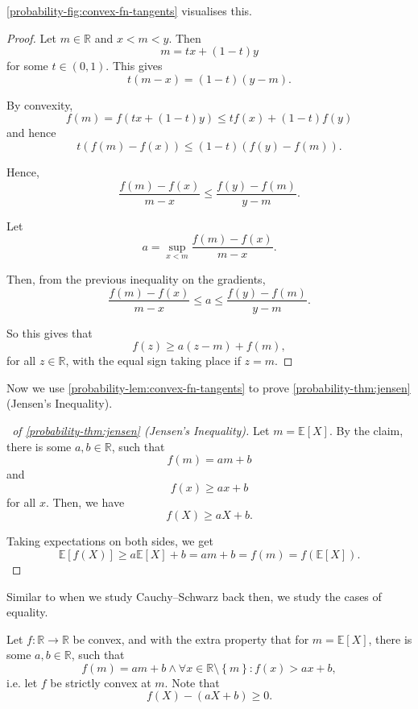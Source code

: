 \documentclass[11pt]{article}
\numberwithin{equation}{section}
\theoremstyle{definition}
\theoremstyle{remark}
\newcommand{\pqty}[1]{\left(#1\right)}
\newcommand{\bqty}[1]{\left[#1\right]}
\newcommand{\Bqty}[1]{\left\{#1\right\}}
\newcommand{\oointv}[2]{(#1,#2)}
\newcommand{\functiondomain}[3]{#1:#2\to #3}
\newcommand{\RR}{\mathbb R}
\newcommand{\Expt}{\mathbb E}
\begin{document}
\autoref{probability-fig:convex-fn-tangents} visualises this.

\begin{proof}\label{probability-proof-030}
    Let \(m \in \RR\) and \(x < m < y\). Then
    \[
        m = tx + \pqty{1 - t}y
    \]
    for some \(t \in \oointv{0}{1}\). This gives
    \[
        t\pqty{m - x} = \pqty{1 - t} \pqty{y - m}.
    \]

    By convexity,
    \[
        f\pqty{m} = f\pqty{tx + \pqty{1 - t} y} \leq t f\pqty{x} + \pqty{1 - t} f\pqty{y}
    \]
    and hence
    \[
        t\pqty{f\pqty{m} - f\pqty{x}} \leq \pqty{1 - t} \pqty{f\pqty{y} - f\pqty{m}}.
    \]

    Hence,
    \[
        \frac{f\pqty{m} - f\pqty{x}}{m - x} \leq \frac{f\pqty{y} - f\pqty{m}}{y - m}.
    \]

    Let
    \[
        a = \sup_{x < m} \frac{f\pqty{m} - f\pqty{x}}{m - x}.
    \]

    Then, from the previous inequality on the gradients,
    \[
        \frac{f\pqty{m} - f\pqty{x}}{m - x} \leq a \leq \frac{f\pqty{y} - f\pqty{m}}{y - m}.
    \]

    So this gives that
    \[
        f\pqty{z} \geq a\pqty{z - m} + f\pqty{m},
    \]
    for all \(z \in \RR\), with the equal sign taking place if \(z = m\).
\end{proof}

Now we use \autoref{probability-lem:convex-fn-tangents} to prove \autoref{probability-thm:jensen} (Jensen's Inequality).

\begin{proof}[\proofname\ of \autoref{probability-thm:jensen} (Jensen's Inequality)]\label{probability-proof-031}
    Let \(m = \Expt\bqty{X}\). By the claim, there is some \(a, b \in \RR\), such that
    \[
        f\pqty{m} = am + b
    \]
    and
    \[
        f\pqty{x} \geq ax + b
    \]
    for all \(x\). Then, we have
    \[
        f\pqty{X} \geq aX + b.
    \]

    Taking expectations on both sides, we get
    \[
        \Expt\bqty{f\pqty{X}} \geq a \Expt\bqty{X} + b = am + b = f\pqty{m} = f\pqty{\Expt\bqty{X}}.
    \]
\end{proof}

Similar to when we study Cauchy--Schwarz back then, we study the cases of equality.

Let \(\functiondomain{f}{\RR}{\RR}\) be convex, and with the extra property that for \(m = \Expt\bqty{X}\), there is some \(a, b \in \RR\), such that
\[
    f\pqty{m} = am + b \land \forall x \in \RR \setminus \Bqty{m}: f\pqty{x} > ax + b,
\]
i.e. let \(f\) be strictly convex at \(m\). Note that 
\[
    f\pqty{X} - \pqty{aX + b} \geq 0.
\]
\end{document}

